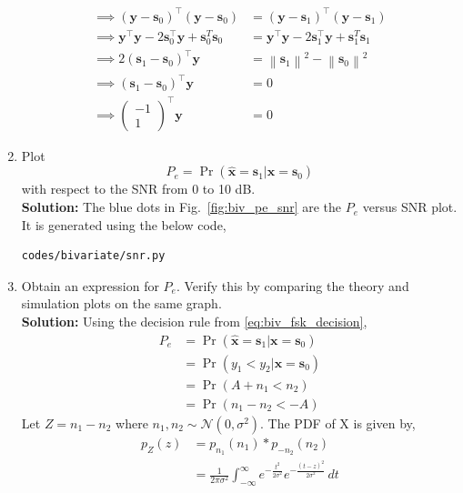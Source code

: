 \documentclass[journal,8pt,onecolumn]{IEEEtran}
\newcommand\figref{Fig.~\ref}
\providecommand{\mbf}{\mathbf}
\providecommand{\pr}[1]{\ensuremath{\Pr\left(#1\right)}}
\providecommand{\brak}[1]{\ensuremath{\left(#1\right)}}
\providecommand{\norm}[1]{\left\lVert#1\right\rVert}
\newcommand{\solution}{\noindent \textbf{Solution: }}
\newcommand{\myvec}[1]{\ensuremath{\begin{pmatrix}#1\end{pmatrix}}}
\providecommand{\gauss}[2]{\mathcal{N}\ensuremath{\left(#1,#2\right)}}
\let\vec\mathbf
\begin{document}
\begin{enumerate}
\begin{align*}
	\implies \brak{\vec{y}-\vec{s}_0}^\top \brak{\vec{y}-\vec{s}_0} &= \brak{\vec{y}-\vec{s}_1}^\top \brak{\vec{y}-\vec{s}_1}\\
	\implies \vec{y}^\top\vec{y} - 2\vec{s}_0^\top \vec{y} + \vec{s}_0^T\vec{s}_0 &= \vec{y}^\top\vec{y} - 2\vec{s}_1^\top \vec{y} + \vec{s}_1^T\vec{s}_1\\
	\implies 2\brak{\vec{s}_1-\vec{s}_0}^\top \vec{y} &= \norm{\vec{s}_1}^2 - \norm{\vec{s}_0}^2\\
	\implies \brak{\vec{s}_1-\vec{s}_0}^\top \vec{y} &= 0\\
	\implies \myvec{-1\\1}^\top \vec{y} &= 0
\end{align*}
%
\item
Plot 
\begin{equation} 
P_e = \pr{\hat{\mbf{x}} = \mbf{s}_1|\mbf{x} = \mbf{s}_0}
\label{eq:prob_error_fsk}
\end{equation}
with respect to the SNR from 0 to 10 dB.\\
\solution The blue dots in \figref{fig:biv_pe_snr} are the $P_e$ versus SNR plot. It is generated using the below code,
\begin{lstlisting}
codes/bivariate/snr.py
\end{lstlisting}
%
\item
Obtain an expression for $P_e$. Verify this by comparing the theory and simulation plots on the same graph.\\
\solution Using the decision rule from \eqref{eq:biv_fsk_decision},
\begin{align}
	\nonumber
	P_e &= \pr{\hat{\mbf{x}} = \mbf{s}_1|\mbf{x} = \mbf{s}_0}\\\nonumber
	&= \pr{y_1 < y_2|\mbf{x} = \mbf{s}_0}\\\nonumber
	&= \pr{A+n_1 < n_2}\\
	\label{eq:prob_error_fsk_inter}
	&= \pr{n_1-n_2 < -A}
\end{align}
Let $Z = n_1-n_2$ where $n_1, n_2 \sim \gauss{0}{\sigma^2}$. The PDF of X is given by,
\begin{align}
	\nonumber
	p_Z(z) &= p_{n_1}(n_1) \ast p_{-n_2}(n_2)\\\nonumber
	&= \frac{1}{2\pi\sigma^2}\int_{-\infty}^{\infty} e^{-\frac{t^2}{2\sigma^2}}e^{-\frac{(t-z)^2}{2\sigma^2}}  \,dt\\\nonumber

\end{align}
\end{enumerate}
\end{document}
